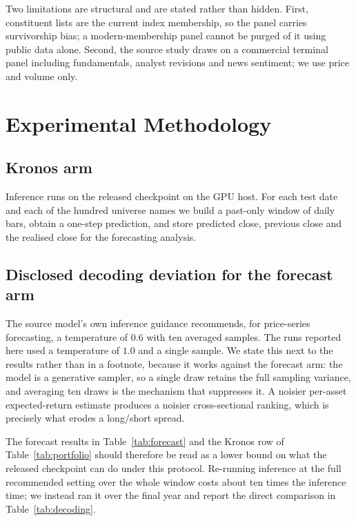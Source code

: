 \documentclass[conference]{IEEEtran}
\begin{document}
Two limitations are structural and are stated rather than hidden. First,
constituent lists are the current index membership, so the panel carries
survivorship bias; a modern-membership panel cannot be purged of it using
public data alone. Second, the source study draws on a commercial terminal
panel including fundamentals, analyst revisions and news sentiment; we use
price and volume only.

\section{Experimental Methodology}
\label{sec:methods}

\subsection{Kronos arm}
Inference runs on the released checkpoint on the GPU host. For each test date
and each of the hundred universe names we build a past-only window of daily
bars, obtain a one-step prediction, and store predicted close, previous close
and the realised close for the forecasting analysis.


\subsection{Disclosed decoding deviation for the forecast arm}
\label{sec:kronos-decoding}

The source model's own inference guidance recommends, for price-series
forecasting, a temperature of $0.6$ with ten averaged samples. The runs reported
here used a temperature of $1.0$ and a single sample. We state this next to the
results rather than in a footnote, because it works against the forecast arm:
the model is a generative sampler, so a single draw retains the full sampling
variance, and averaging ten draws is the mechanism that suppresses it. A noisier
per-asset expected-return estimate produces a noisier cross-sectional ranking,
which is precisely what erodes a long/short spread.

The forecast results in Table~\ref{tab:forecast} and the Kronos row of
Table~\ref{tab:portfolio} should therefore be read as a lower bound on what the
released checkpoint can do under this protocol. Re-running inference at the full
recommended setting over the whole window costs about ten times the inference
time; we instead ran it over the final year and report the direct comparison in
Table~\ref{tab:decoding}.
\end{document}
